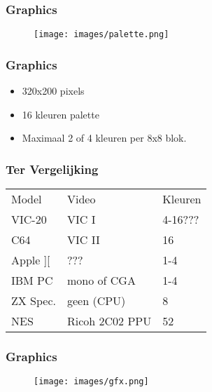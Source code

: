 \documentclass[aspectratio=43]{uva-inf-presentation}
\begin{document}

\begin{frame}
\frametitle{Graphics}

\begin{figure}
\texttt{[image: images/palette.png]}
\end{figure}

\end{frame}


\begin{frame}
\frametitle{Graphics}

\begin{itemize}
\item 320x200 pixels
\item 16 kleuren palette
\item Maximaal 2 of 4 kleuren per 8x8 blok.
\end{itemize}

\end{frame}


\begin{frame}
\frametitle{Ter Vergelijking}

\begin{tabular}{|l|l|l|}
\hline Model & Video & Kleuren \\
VIC-20 & VIC I & 4-16??? \\
C64 & VIC II & 16 \\
Apple ][ & ??? & 1-4 \\
IBM PC & mono of CGA & 1-4 \\
ZX Spec. & geen (CPU) & 8 \\ \hline
NES & Ricoh 2C02 PPU & 52 \\ \hline
\end{tabular}

\end{frame}


\begin{frame}
\frametitle{Graphics}

\begin{figure}
\texttt{[image: images/gfx.png]}
\end{figure}

\end{frame}
\end{document}

